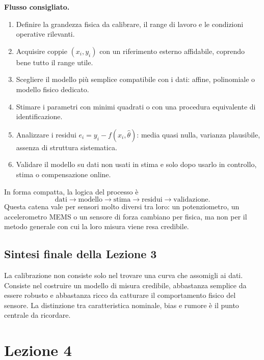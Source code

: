 \documentclass[11pt,a4paper]{article}
\begin{document}
\begin{focusbox}
\textbf{Flusso consigliato.}
\begin{enumerate}[leftmargin=1.5em]
\item Definire la grandezza fisica da calibrare, il range di lavoro e le condizioni operative rilevanti.
\item Acquisire coppie \((x_i,y_i)\) con un riferimento esterno affidabile, coprendo bene tutto il range utile.
\item Scegliere il modello pi\`u semplice compatibile con i dati: affine, polinomiale o modello fisico dedicato.
\item Stimare i parametri con minimi quadrati o con una procedura equivalente di identificazione.
\item Analizzare i residui \(e_i=y_i-f(x_i,\hat\theta)\): media quasi nulla, varianza plausibile, assenza di struttura sistematica.
\item Validare il modello su dati non usati in stima e solo dopo usarlo in controllo, stima o compensazione online.
\end{enumerate}
\end{focusbox}

In forma compatta, la logica del processo \`e
\[
\text{dati} \longrightarrow \text{modello} \longrightarrow \text{stima} \longrightarrow \text{residui} \longrightarrow \text{validazione}.
\]
Questa catena vale per sensori molto diversi tra loro: un potenziometro, un accelerometro MEMS o un sensore di forza cambiano per fisica, ma non per il metodo generale con cui la loro misura viene resa credibile.

\subsection*{Sintesi finale della Lezione 3}

La calibrazione non consiste solo nel trovare una curva che assomigli ai dati. Consiste nel costruire un modello di misura credibile, abbastanza semplice da essere robusto e abbastanza ricco da catturare il comportamento fisico del sensore. La distinzione tra caratteristica nominale, bias e rumore è il punto centrale da ricordare.


\clearpage
\section{Lezione 4}
\end{document}
